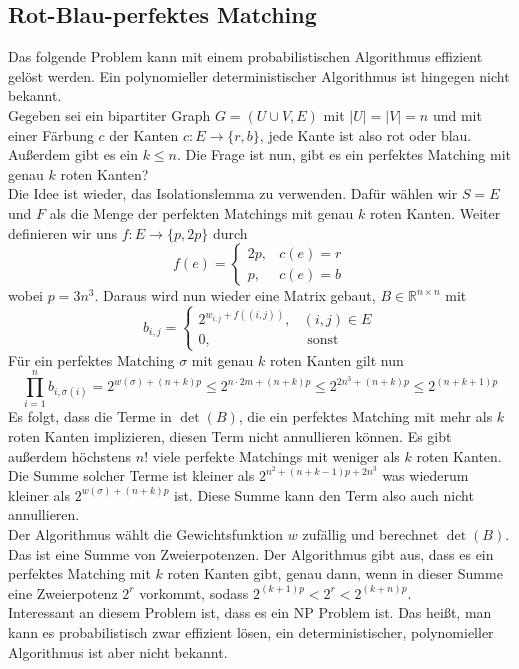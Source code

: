\documentclass[a4paper, 12pt]{article}
\theoremstyle{plain}
\theoremstyle{definition}
\theoremstyle{lemma}
\theoremstyle{remark}
\theoremstyle{corollary}
\theoremstyle{example}
\begin{document}
	\subsection{Rot-Blau-perfektes Matching}
	Das folgende Problem kann mit einem probabilistischen Algorithmus effizient gelöst werden. Ein polynomieller deterministischer Algorithmus ist hingegen nicht bekannt.\\
	Gegeben sei ein bipartiter Graph $G=(U\cup V, E)$ mit $\left|U\right| = \left|V\right| = n$ und mit einer Färbung $c$ der Kanten $c:E \to \{r,b\}$, jede Kante ist also rot oder blau. Außerdem gibt es ein $k\leq n$. Die Frage ist nun, gibt es ein perfektes Matching mit genau $k$ roten Kanten?\\
	Die Idee ist wieder, das Isolationslemma zu verwenden. Dafür wählen wir $S=E$ und $F$ als die Menge der perfekten Matchings mit genau $k$ roten Kanten. Weiter definieren wir uns $f:E \to \{p,2p\}$ durch \[f(e) = \begin{cases}
		2p, & c(e) = r\\
		p, & c(e) = b
	\end{cases}\] wobei $p=3n^3$.
	Daraus wird nun wieder eine Matrix gebaut, $B \in \mathbb{R}^{n\times n}$ mit \[b_{i,j} = \begin{cases}
		2^{w_{i,j} + f((i,j))}, & (i,j) \in E\\
		0, & \text{ sonst}
	\end{cases}\]
	Für ein perfektes Matching $\sigma$ mit genau $k$ roten Kanten gilt nun $$\prod_{i=1}^n b_{i,\sigma(i)} = 2^{w(\sigma) + (n+k)p} \leq 2^{n\cdot 2m + (n+k)p} \leq 2^{2n^3 + (n+k)p} \leq 2^{(n+k+1)p}$$ Es folgt, dass die Terme in $\det(B)$, die ein perfektes Matching mit mehr als $k$ roten Kanten implizieren, diesen Term nicht annullieren können. Es gibt außerdem höchstens $n!$ viele perfekte Matchings mit weniger als $k$ roten Kanten. Die Summe solcher Terme ist kleiner als $2^{n^2+(n+k-1)p+2n^3}$ was wiederum kleiner als $2^{w(\sigma)+(n+k)p}$ ist. Diese Summe kann den Term also auch nicht annullieren.\\
	Der Algorithmus wählt die Gewichtsfunktion $w$ zufällig und berechnet $\det(B)$. Das ist eine Summe von Zweierpotenzen. Der Algorithmus gibt aus, dass es ein perfektes Matching mit $k$ roten Kanten gibt, genau dann, wenn in dieser Summe eine Zweierpotenz $2^r$ vorkommt, sodass $2^{(k+1)p} <2^r <2^{(k+n)p}$.\\
	Interessant an diesem Problem ist, dass es ein NP Problem ist. Das heißt, man kann es probabilistisch zwar effizient lösen, ein deterministischer, polynomieller Algorithmus ist aber nicht bekannt.
\end{document}
